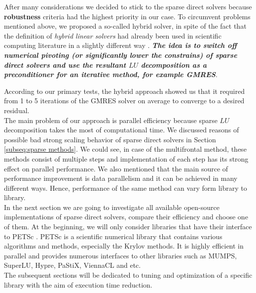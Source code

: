 After many considerations we decided to stick to the sparse direct solvers because \textbf{robustness} criteria had the highest priority in our case. To circumvent problems mentioned above, we proposed a so-called hybrid solver, in spite of the fact that the definition of \textit{hybrid linear solvers} had already been used in scientific computing literature in a slightly different way \cite{shylu-hybrid-solver}. \textbf{\textit{The idea is to switch off numerical pivoting (or significantly lower the constrains) of sparse direct solvers and use the resultant $LU$ decomposition as a preconditioner for an iterative method, for example GMRES}}.\\



According to our primary tests, the hybrid approach showed us that it required from 1 to 5 iterations of the GMRES solver on average to converge to a desired residual.\\


The main problem of our approach is parallel efficiency because sparse $LU$ decomposition takes the most of computational time. We discussed reasons of possible bad strong scaling behavior of sparse direct solvers in Section \ref{subseq:sparse methods}. We could see, in case of the multifrontal method, these methods consist of multiple steps and implementation of each step has its strong effect on parallel performance. We also mentioned that the main source of performance improvement is data parallelism and it can be achieved in many different ways. Hence, performance of the same method can vary form library to library.\\


In the next section we are going to investigate all available open-source implementations of sparse direct solvers, compare their efficiency and choose one of them. At the beginning, we will only consider libraries that have their interface to PETSc \cite{petsc-web-page}. PETSc is a scientific numerical library that contains various algorithms and methods, especially the Krylov methods. It is highly efficient in parallel and provides numerous interfaces to other libraries such as MUMPS, SuperLU, Hypre, PaStiX, ViennaCL and etc.\\ 


The subsequent sections will be dedicated to tuning and optimization of a specific library with the aim of execution time reduction. \\
